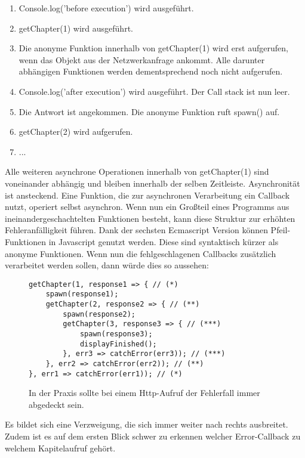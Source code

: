 \begin{enumerate}
    \item Console.log('before execution') wird ausgeführt.
    \item getChapter(1) wird ausgeführt.
    \item Die anonyme Funktion innerhalb von getChapter(1) wird erst aufgerufen, wenn das Objekt aus der Netzwerkanfrage ankommt. Alle darunter abhängigen Funktionen werden dementsprechend noch nicht aufgerufen.
    \item Console.log('after execution') wird ausgeführt. Der Call stack ist nun leer.
    \item Die Antwort ist angekommen. Die anonyme Funktion ruft spawn() auf.
    \item getChapter(2) wird aufgerufen.
    \item ...
\end{enumerate}

\noindent
Alle weiteren asynchrone Operationen innerhalb von getChapter(1) sind voneinander abhängig und bleiben innerhalb der selben Zeitleiste. Asynchronität ist ansteckend. Eine Funktion, die zur asynchronen Verarbeitung ein Callback nutzt, operiert selbst asynchron. Wenn nun ein Großteil eines Programms aus ineinandergeschachtelten Funktionen besteht, kann diese Struktur zur erhöhten Fehleranfälligkeit führen. Dank der sechsten Ecmascript Version können Pfeil-Funktionen in Javascript genutzt werden. Diese sind syntaktisch kürzer als anonyme Funktionen. Wenn nun die fehlgeschlagenen Callbacks zusätzlich verarbeitet werden sollen, dann würde dies so aussehen:

\begin{figure}[H]
\begin{lstlisting}[basicstyle=\small]
getChapter(1, response1 => { // (*)
    spawn(response1);
    getChapter(2, response2 => { // (**)
        spawn(response2);
        getChapter(3, response3 => { // (***)
            spawn(response3);
            displayFinished();
        }, err3 => catchError(err3)); // (***)
    }, err2 => catchError(err2)); // (**)
}, err1 => catchError(err1)); // (*)
\end{lstlisting}
\caption{In der Praxis sollte bei einem Http-Aufruf der Fehlerfall immer abgedeckt sein.}
\label{Nested-Callback-with-catch-error}
\end{figure}

\noindent
Es bildet sich eine Verzweigung, die sich immer weiter nach rechts ausbreitet. Zudem ist es auf dem ersten Blick schwer zu erkennen welcher Error-Callback zu welchem Kapitelaufruf gehört.\\

